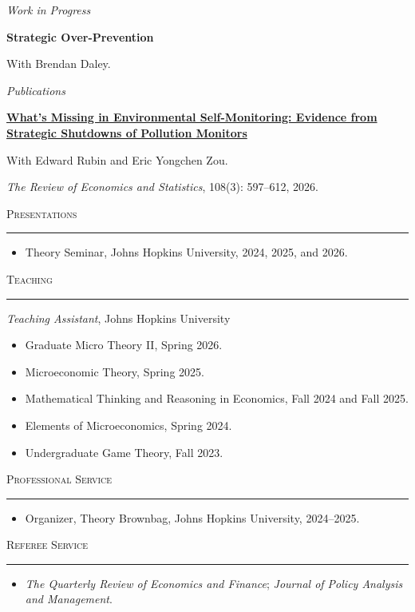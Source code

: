 \documentclass[11pt]{article}
\newcommand{\cvsection}[1]{%
  \vspace{1.1em}
  {\large\scshape #1}\par
  \vspace{0.56em}
  \hrule
  \vspace{0.62em}
}
\newcommand{\researchsubsection}[1]{%
  {\itshape #1}\par
}
\begin{document}
\vspace{0.85em}
\researchsubsection{Work in Progress}
\vspace{0.35em}

\textbf{Strategic Over-Prevention}\par
With Brendan Daley.\par

\vspace{0.85em}
\researchsubsection{Publications}
\vspace{0.35em}

\textbf{\href{https://doi.org/10.1162/rest_a_01477}{What's Missing in Environmental Self-Monitoring: Evidence from Strategic Shutdowns of Pollution Monitors}}\par
With Edward Rubin and Eric Yongchen Zou.\par
\textit{The Review of Economics and Statistics}, 108(3): 597--612, 2026.\par

\clearpage
\cvsection{Presentations}
\begin{itemize}[label={}]
  \item Theory Seminar, Johns Hopkins University, 2024, 2025, and 2026.
\end{itemize}

\cvsection{Teaching}
\textit{Teaching Assistant}, Johns Hopkins University
\vspace{0.2em}

\begin{itemize}[label={}]
  \item Graduate Micro Theory II, Spring 2026.
  \item Microeconomic Theory, Spring 2025.
  \item Mathematical Thinking and Reasoning in Economics, Fall 2024 and Fall 2025.
  \item Elements of Microeconomics, Spring 2024.
  \item Undergraduate Game Theory, Fall 2023.
\end{itemize}

\cvsection{Professional Service}
\begin{itemize}[label={}]
  \item Organizer, Theory Brownbag, Johns Hopkins University, 2024--2025.
\end{itemize}

\cvsection{Referee Service}
\begin{itemize}[label={}]
  \item \textit{The Quarterly Review of Economics and Finance}; \textit{Journal of Policy Analysis and Management}.
\end{itemize}
\end{document}
